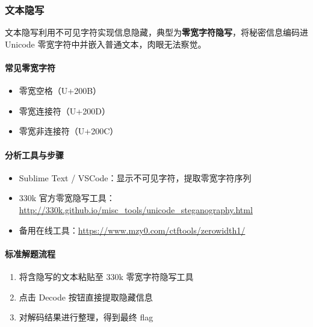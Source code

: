 \subsubsection{文本隐写}
文本隐写利用不可见字符实现信息隐藏，典型为\textbf{零宽字符隐写}，将秘密信息编码进 Unicode 零宽字符中并嵌入普通文本，肉眼无法察觉。

\paragraph{常见零宽字符}
\begin{itemize}[leftmargin=*]
    \item 零宽空格（U+200B）
    \item 零宽连接符（U+200D）
    \item 零宽非连接符（U+200C）
\end{itemize}

\paragraph{分析工具与步骤}
\begin{itemize}[leftmargin=*]
    \item Sublime Text / VSCode：显示不可见字符，提取零宽字符序列
    \item 330k 官方零宽隐写工具：\url{http://330k.github.io/misc_tools/unicode_steganography.html}
    \item 备用在线工具：\url{https://www.mzy0.com/ctftools/zerowidth1/}
\end{itemize}

\paragraph{标准解题流程}
\begin{enumerate}[leftmargin=*]
    \item 将含隐写的文本粘贴至 330k 零宽字符隐写工具
    \item 点击 Decode 按钮直接提取隐藏信息
    \item 对解码结果进行整理，得到最终 flag
\end{enumerate}

